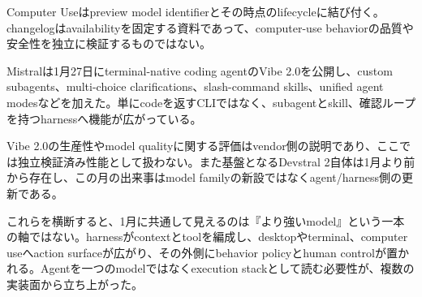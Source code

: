 \begin{claimboundary}
Computer Useはpreview model identifierとその時点のlifecycleに結び付く。changelogはavailabilityを固定する資料であって、computer-use behaviorの品質や安全性を独立に検証するものではない。\autocite{src-a24fd97eb3d0}
\end{claimboundary}

Mistralは1月27日にterminal-native coding agentのVibe 2.0を公開し、custom subagents、multi-choice clarifications、slash-command skills、unified agent modesなどを加えた。単にcodeを返すCLIではなく、subagentとskill、確認ループを持つharnessへ機能が広がっている。\autocite{src-d8b7c1c36830}


\begin{claimboundary}
Vibe 2.0の生産性やmodel qualityに関する評価はvendor側の説明であり、ここでは独立検証済み性能として扱わない。また基盤となるDevstral 2自体は1月より前から存在し、この月の出来事はmodel familyの新設ではなくagent/harness側の更新である。\autocite{src-d8b7c1c36830}
\end{claimboundary}

これらを横断すると、1月に共通して見えるのは『より強いmodel』という一本の軸ではない。harnessがcontextとtoolを編成し、desktopやterminal、computer useへaction surfaceが広がり、その外側にbehavior policyとhuman controlが置かれる。Agentを一つのmodelではなくexecution stackとして読む必要性が、複数の実装面から立ち上がった。\autocite{src-a24fd97eb3d0,src-ae10eb4597fe,src-d8b7c1c36830,src-f6aa679babd7}
